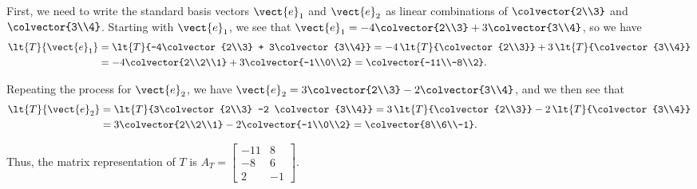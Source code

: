 First, we need to write the standard basis vectors $\vect{e}_1$ and $\vect{e}_2$ as linear combinations of $\colvector{2\\3}$ and $\colvector{3\\4}$.  Starting with $\vect{e}_1$, we see that 
$\vect{e}_1 = -4\colvector{2\\3} + 3\colvector{3\\4}$, so we have
\begin{align*}
\lt{T}{\vect{e}_1} 
&= \lt{T}{-4\colvector{2\\3} + 3\colvector{3\\4}} 
= -4\,\lt{T}{\colvector{2\\3}} + 3 \,\lt{T}{\colvector{3\\4}}\\
%
&= -4\colvector{2\\2\\1} + 3\colvector{-1\\0\\2} 
= \colvector{-11\\-8\\2}.
\end{align*}

Repeating the process for $\vect{e}_2$,  we have 
$\vect{e}_2 = 3\colvector{2\\3} - 2\colvector{3\\4}$, and we then see that
\begin{align*}
\lt{T}{\vect{e}_2} 
&= \lt{T}{3\colvector{2\\3} -2 \colvector{3\\4}} 
= 3\,\lt{T}{\colvector{2\\3}} - 2 \,\lt{T}{\colvector{3\\4}}\\
%
&= 3\colvector{2\\2\\1} -2 \colvector{-1\\0\\2} 
= \colvector{8\\6\\-1}.
\end{align*}

Thus, the matrix representation of $T$ is 
$A_T = \begin{bmatrix} -11 & 8\\ -8 & 6\\2 & -1 \end{bmatrix}$.